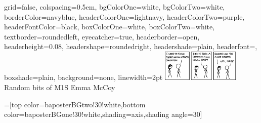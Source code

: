 \documentclass[landscape,final,a0paper]{baposter}
\begin{document}
\newlength{\leftimgwidth}
\begin{poster}%
  {
  grid=false,
  colspacing=0.5em,
  bgColorOne=white,
  bgColorTwo=white,
  borderColor=navyblue,
  headerColorOne=lightnavy,
  headerColorTwo=purple,
  headerFontColor=black,
 boxColorOne=white,
 boxColorTwo=white,
  textborder=roundedleft,
  eyecatcher=true,
  headerborder=open,
  headerheight=0.08\textheight,
  headershape=roundedright,
  headershade=plain,
  headerfont=\Large\textsf, %
  boxshade=plain,
  background=none,
  linewidth=2pt
  }
  {\includegraphics[width=10em]{correlation.png}} %
  {\sf %
  Random bits of M1S}
  {\sf %
  \vspace{1em} 
	Emma McCoy
  }
  { %
  }

  =[top color=baposterBGtwo!30!white,bottom color=baposterBGone!30!white,shading=axis,shading angle=30]

     \setlength{\leftimgwidth}{0.78em+8.0em}

\newcommand{\colouredcircle}[1]{%
      \tikz{\useasboundingbox (-0.2em,-0.32em) rectangle(0.2em,0.32em); \draw[draw=black,fill=baposterBGone!80!black!#1!white,line width=0.03em] (0,0) circle(0.18em);}}


\end{poster}
\end{document}
